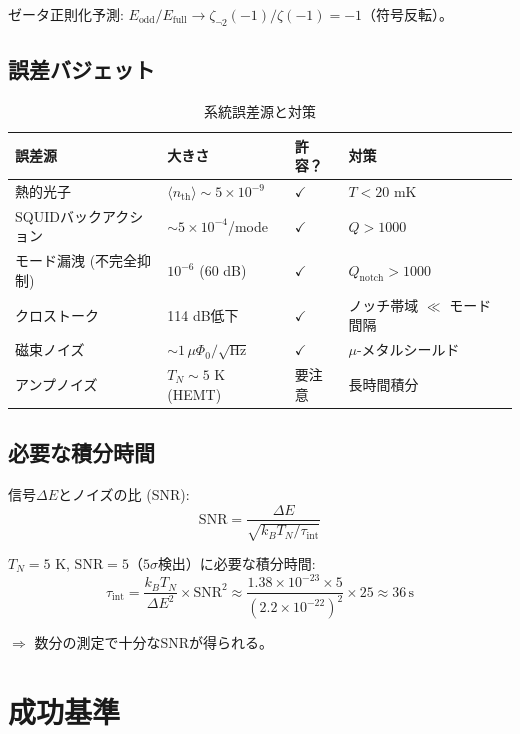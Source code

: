 \documentclass[12pt,a4paper]{article}
\begin{document}
ゼータ正則化予測: $E_{\mathrm{odd}}/E_{\mathrm{full}} \to \zeta_{\neg 2}(-1)/\zeta(-1) = -1$（符号反転）。

\subsection{誤差バジェット}

\begin{table}[h]
\centering
\caption{系統誤差源と対策}
\small
\begin{tabular}{@{}llll@{}}
\toprule
誤差源 & 大きさ & 許容？ & 対策 \\
\midrule
熱的光子 & $\langle n_{\mathrm{th}}\rangle \sim 5 \times 10^{-9}$ & $\checkmark$ & $T < 20$ mK \\
SQUIDバックアクション & $\sim 5 \times 10^{-4}$/mode & $\checkmark$ & $Q > 1000$ \\
モード漏洩 (不完全抑制) & $10^{-6}$ (60 dB) & $\checkmark$ & $Q_{\mathrm{notch}} > 1000$ \\
クロストーク & 114 dB低下 & $\checkmark$ & ノッチ帯域 $\ll$ モード間隔 \\
磁束ノイズ & $\sim 1\,\mu\Phi_0/\sqrt{\text{Hz}}$ & $\checkmark$ & $\mu$-メタルシールド \\
アンプノイズ & $T_N \sim 5$ K (HEMT) & 要注意 & 長時間積分 \\
\bottomrule
\end{tabular}
\end{table}

\subsection{必要な積分時間}

信号$\Delta E$とノイズの比 (SNR):
\begin{equation}
  \mathrm{SNR} = \frac{\Delta E}{\sqrt{k_B T_N / \tau_{\mathrm{int}}}}
\end{equation}

$T_N = 5$ K, $\mathrm{SNR} = 5$（$5\sigma$検出）に必要な積分時間:
\begin{equation}
  \tau_{\mathrm{int}} = \frac{k_B T_N}{\Delta E^2} \times \mathrm{SNR}^2
  \approx \frac{1.38 \times 10^{-23} \times 5}{(2.2 \times 10^{-22})^2} \times 25
  \approx 36\,\text{s}
\end{equation}

$\Rightarrow$ 数分の測定で十分なSNRが得られる。

\section{成功基準}
\end{document}
